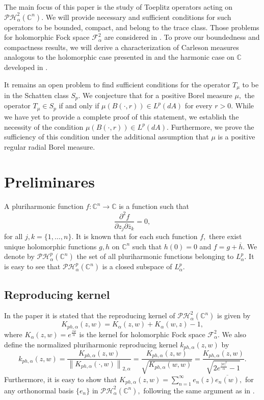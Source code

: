 \documentclass[10pt,leqno]{amsart}
\theoremstyle{remark}
\numberwithin{equation}{section}
\newcommand{\ph}{\mathcal{PH}_\alpha^p(\mathbb{C}^n)}%
\newcommand{\hph}{\mathcal{PH}_\alpha^2(\mathbb{C}^n)}%
\newcommand{\Kph}{K_{ph,\alpha}}%
\newcommand{\kph}{k_{ph,\alpha}}%
\begin{document}
The main focus of this paper is the study of Toeplitz operators acting on $\hph.$ We will provide necessary and sufficient conditions for such operators to be bounded, compact, and belong to the trace class. Those problems for holomorphic Fock space $\mathcal{F}_\alpha^2$ are considered in \cite{isralowitzToeplitzOperatorsFock2010}.  To prove our boundedness and compactness results, we will derive a characterization of Carleson measures analogous to the holomorphic case presented in \cite{KeheZhuAnalysisOnFockSpaces} and the harmonic case on $\mathbb{C}$ developed in \cite{DjordjijeCarlesonMeasures2021}.

It remains an open problem to find sufficient conditions for the operator $T_\mu$ to be in the Schatten class $S_p.$
We conjecture that for a positive Borel measure $\mu,$ the operator $T_\mu \in S_p$ if and only if $\mu(B(\cdot,r)) \in L^p(dA)$ for every $r>0.$ While we have yet to provide a complete proof of this statement, we establish the necessity of the condition $\mu(B(\cdot,r)) \in L^p(dA).$ Furthermore, we prove the sufficiency of this condition under the additional assumption that $\mu$ is a positive regular radial Borel measure.


\section{Preliminares}
A pluriharmonic function \(f: \mathbb{C}^{n}\to \mathbb{C}\) is a function such that
\[
	\frac{\partial ^2 f}{\partial z_j \partial \overline{z}_k}= 0,
\]
for all \(j,k = \{1,\dots,n\}.\) It is known that for each such function \(f,\) there exist unique holomorphic functions $g,h$  on $\mathbb{C}^{n}$  such that $h(0)=0$  and $f=g+\overline{h}.$ We denote by $\ph$ the set of all pluriharmonic functions belonging to $L^p_\alpha.$ It is easy to see that $\ph$ is a closed subspace of $L^p_\alpha.$

\subsection{Reproducing kernel}

In the paper \cite{FulscheRobertToeplitzOperatorsonPluriharmonicFunctionSpaces} it is stated that the reproducing kernel of $\hph$ is given by
\[
	\Kph(z,w)=K_{\alpha}(z,w)+K_{\alpha}(w,z)-1,
\]
where $K_{\alpha}(z,w)=e^{ \frac{z \bar{w}}{\alpha}}$ is the kernel for holomorphic Fock space $\mathcal{F}^2_\alpha.$
We also define the normalized pluriharmonic reproducing kernel $\kph(z,w)$ by
\[
	k_{ph,\alpha}(z,w)=\frac{\Kph(z,w)}{\left\lVert \Kph(\cdot,w) \right\rVert _{2,\alpha}} = \frac{\Kph(z,w)}{\sqrt{\Kph(w,w)}}= \frac{\Kph (z,w)}{\sqrt{2e^{\frac{|w|^2}{\alpha}}-1}}.
\]
Furthermore, it is easy to show that $\Kph(z,w)=\sum_{n=1}^{\infty} e_n(z)\overline{e_n(w)},$ for any  orthonormal basis $\{e_n\}$ in $\hph,$ following the same argument as in \cite[Theorem 4.19]{zhuOperatorTheoryFunction2007}.
\end{document}
